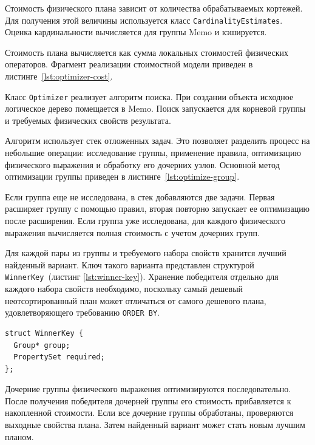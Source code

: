 \documentclass[14pt, russian]{scrartcl}
\newcommand{\refAlgo}[1]{(листинг \ref{#1})}
\begin{document}
Стоимость физического плана зависит от количества обрабатываемых кортежей. Для
получения этой величины используется класс \verb|CardinalityEstimates|. Оценка
кардинальности вычисляется для группы Memo и кэшируется.

Стоимость плана вычисляется как сумма локальных стоимостей физических
операторов. Фрагмент реализации стоимостной модели приведен в
листинге~\ref{lst:optimizer-cost}.

Класс \verb|Optimizer| реализует алгоритм поиска. При создании объекта исходное
логическое дерево помещается в Memo. Поиск запускается для корневой группы и
требуемых физических свойств результата.

Алгоритм использует стек отложенных задач. Это позволяет разделить процесс на
небольшие операции: исследование группы, применение правила, оптимизацию
физического выражения и обработку его дочерних узлов. Основной метод оптимизации
группы приведен в листинге~\ref{lst:optimize-group}.

Если группа еще не исследована, в стек добавляются две задачи. Первая расширяет
группу с помощью правил, вторая повторно запускает ее оптимизацию после
расширения. Если группа уже исследована, для каждого физического выражения
вычисляется полная стоимость с учетом дочерних групп.

Для каждой пары из группы и требуемого набора свойств хранится лучший найденный
вариант. Ключ такого варианта представлен структурой
\verb|WinnerKey|~\refAlgo{lst:winner-key}. Хранение победителя отдельно для каждого
набора свойств необходимо, поскольку самый дешевый неотсортированный план может
отличаться от самого дешевого плана, удовлетворяющего требованию
\verb|ORDER BY|.

\begin{listing}[H]
  \caption{Ключ для хранения лучшего плана по группе и свойствам.}
  \label{lst:winner-key}
  \begin{verbatim}
struct WinnerKey {
  Group* group;
  PropertySet required;
};
\end{verbatim}
\end{listing}

Дочерние группы физического выражения оптимизируются последовательно. После
получения победителя дочерней группы его стоимость прибавляется к накопленной
стоимости. Если все дочерние группы обработаны, проверяются выходные свойства
плана. Затем найденный вариант может стать новым лучшим планом.
\end{document}
